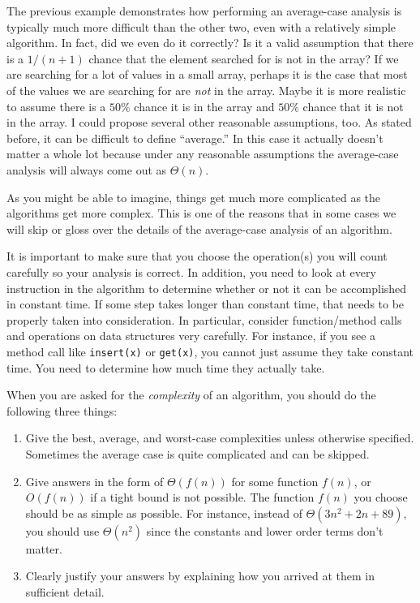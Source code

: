 The previous example demonstrates how performing an average-case analysis is typically
much more difficult than the other two, even with a relatively simple algorithm.  
In fact, did we even do it correctly?
Is it a valid assumption that there is a $1/(n+1)$ chance that the element searched for
is not in the array?  If we are searching for a lot of values in a small array, 
perhaps it is the case that most of the values we are searching for are {\em not} in the array.  
Maybe it is more realistic to assume there is a $50\%$ chance it is in the array 
and $50\%$ chance that it is not in the array.  
I could propose several other reasonable
assumptions, too.  As stated before, it can be difficult to define ``average.''
In this case it actually doesn't matter a whole lot because under any reasonable
assumptions the average-case analysis will always come out as $\Theta(n)$.

As you might be able to imagine, things get much more complicated as the algorithms
get more complex.  This is one of the reasons that in some cases we will skip or
gloss over the details of the average-case analysis of an algorithm.

It is important to make sure that you choose the operation(s) you will count carefully so
your analysis is correct.  
In addition, you need to look at every instruction in the algorithm to determine whether
or not it can be accomplished in constant time.  If some step takes
longer than constant time, that needs to be properly taken into consideration.
In particular, consider function/method calls and operations on data structures 
very carefully.  For instance, if you see a method call like \verb+insert(x)+
or \verb+get(x)+, you cannot just assume they take constant time.  You need to determine
how much time they actually take.

\begin{rem}
When you are asked for the {\em complexity} of an algorithm, you should 
do the following three things:
\begin{enumerate}
\item
Give the best, average, and worst-case complexities unless otherwise specified.
Sometimes the average case is quite complicated and can be skipped.
\item
Give answers  in the form of $\Theta(f(n))$ for some function $f(n)$,
or $O(f(n))$ if a tight bound is not possible.  The function $f(n)$ you choose should
be as simple as possible.  For instance, instead of $\Theta(3n^2+2n+89)$, you should use
$\Theta(n^2)$ since the constants and lower order terms don't matter.
\item
Clearly justify your answers by explaining how you arrived at them in sufficient detail.
\end{enumerate}
\end{rem}

